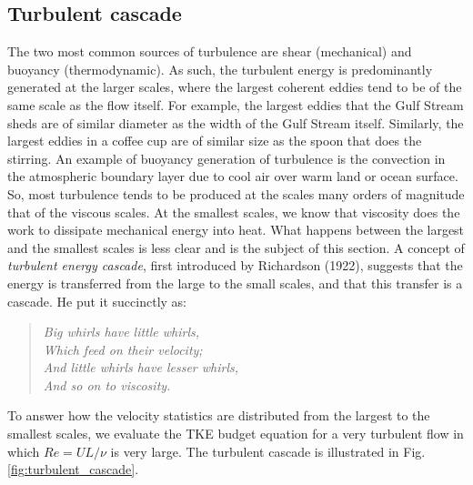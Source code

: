 \documentclass[12pt]{article}
\numberwithin{equation}{section}
\numberwithin{figure}{section}
\numberwithin{table}{section}
\begin{document}
\subsection{Turbulent cascade}

The two most common sources of turbulence are shear (mechanical) and buoyancy
(thermodynamic).
As such, the turbulent energy is predominantly generated at the larger scales,
where the largest coherent eddies tend to be of the same scale as the flow
itself.
For example, the largest eddies that the Gulf Stream sheds are of similar
diameter as the width of the Gulf Stream itself.
Similarly, the largest eddies in a coffee cup are of similar size as the spoon
that does the stirring.
An example of buoyancy generation of turbulence is the convection in the 
atmospheric boundary layer due to cool air over warm land or ocean surface.
So, most turbulence tends to be produced at the scales many orders of magnitude
that of the viscous scales.
At the smallest scales, we know that viscosity does the work to dissipate
mechanical energy into heat.
What happens between the largest and the smallest scales is less clear and is
the subject of this section.
A concept of \textit{turbulent energy cascade},
first introduced by Richardson (1922),
suggests that the energy is transferred from the large to the small scales,
and that this transfer is a cascade.
He put it succinctly as:

\begin{quote}
  \textit{
    \noindent Big whirls have little whirls,\\
    Which feed on their velocity;\\
    And little whirls have lesser whirls,\\
    And so on to viscosity.
  }
\end{quote}

To answer how the velocity statistics are distributed from the largest to the
smallest scales, we evaluate the TKE budget equation for a very turbulent flow
in which $Re = UL/\nu$ is very large.
The turbulent cascade is illustrated in Fig. \ref{fig:turbulent_cascade}.
\end{document}
